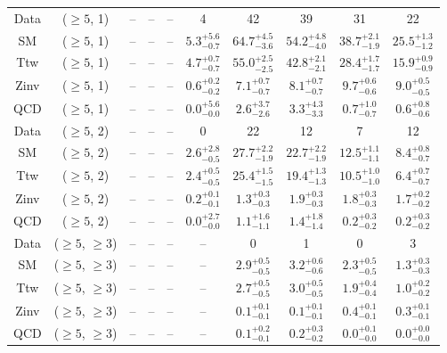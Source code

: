 \begin{table}[h!]
{\begin{tabular}{cccccccccc}
	Data & ($\ge5$, 1) & -- & -- & -- & 4 & 42 & 39 & 31 & 22 \\[0.5ex] 
	SM & ($\ge5$, 1) & -- & -- & -- & $5.3^{+ 5.6 }_{- 0.7 }$ & $64.7^{+ 4.5 }_{- 3.6 }$ & $54.2^{+ 4.8 }_{- 4.0 }$ & $38.7^{+ 2.1 }_{- 1.9 }$ & $25.5^{+ 1.3 }_{- 1.2 }$ \\[0.5ex] 
	Ttw & ($\ge5$, 1) & -- & -- & -- & $4.7^{+ 0.7 }_{- 0.7 }$ & $55.0^{+ 2.5 }_{- 2.5 }$ & $42.8^{+ 2.1 }_{- 2.1 }$ & $28.4^{+ 1.7 }_{- 1.7 }$ & $15.9^{+ 0.9 }_{- 0.9 }$ \\[0.5ex] 
	Zinv & ($\ge5$, 1) & -- & -- & -- & $0.6^{+ 0.2 }_{- 0.2 }$ & $7.1^{+ 0.7 }_{- 0.7 }$ & $8.1^{+ 0.7 }_{- 0.7 }$ & $9.7^{+ 0.6 }_{- 0.6 }$ & $9.0^{+ 0.5 }_{- 0.5 }$ \\[0.5ex] 
	QCD & ($\ge5$, 1) & -- & -- & -- & $0.0^{+ 5.6 }_{- 0.0 }$ & $2.6^{+ 3.7 }_{- 2.6 }$ & $3.3^{+ 4.3 }_{- 3.3 }$ & $0.7^{+ 1.0 }_{- 0.7 }$ & $0.6^{+ 0.8 }_{- 0.6 }$ \\[0.5ex] 
	Data & ($\ge5$, 2) & -- & -- & -- & 0 & 22 & 12 & 7 & 12 \\[0.5ex] 
	SM & ($\ge5$, 2) & -- & -- & -- & $2.6^{+ 2.8 }_{- 0.5 }$ & $27.7^{+ 2.2 }_{- 1.9 }$ & $22.7^{+ 2.2 }_{- 1.9 }$ & $12.5^{+ 1.1 }_{- 1.1 }$ & $8.4^{+ 0.8 }_{- 0.7 }$ \\[0.5ex] 
	Ttw & ($\ge5$, 2) & -- & -- & -- & $2.4^{+ 0.5 }_{- 0.5 }$ & $25.4^{+ 1.5 }_{- 1.5 }$ & $19.4^{+ 1.3 }_{- 1.3 }$ & $10.5^{+ 1.0 }_{- 1.0 }$ & $6.4^{+ 0.7 }_{- 0.7 }$ \\[0.5ex] 
	Zinv & ($\ge5$, 2) & -- & -- & -- & $0.2^{+ 0.1 }_{- 0.1 }$ & $1.3^{+ 0.3 }_{- 0.3 }$ & $1.9^{+ 0.3 }_{- 0.3 }$ & $1.8^{+ 0.3 }_{- 0.3 }$ & $1.7^{+ 0.2 }_{- 0.2 }$ \\[0.5ex] 
	QCD & ($\ge5$, 2) & -- & -- & -- & $0.0^{+ 2.7 }_{- 0.0 }$ & $1.1^{+ 1.6 }_{- 1.1 }$ & $1.4^{+ 1.8 }_{- 1.4 }$ & $0.2^{+ 0.3 }_{- 0.2 }$ & $0.2^{+ 0.3 }_{- 0.2 }$ \\[0.5ex] 
	Data & ($\ge5$, $\ge3$) & -- & -- & -- & -- & 0 & 1 & 0 & 3 \\[0.5ex] 
	SM & ($\ge5$, $\ge3$) & -- & -- & -- & -- & $2.9^{+ 0.5 }_{- 0.5 }$ & $3.2^{+ 0.6 }_{- 0.6 }$ & $2.3^{+ 0.5 }_{- 0.5 }$ & $1.3^{+ 0.3 }_{- 0.3 }$ \\[0.5ex] 
	Ttw & ($\ge5$, $\ge3$) & -- & -- & -- & -- & $2.7^{+ 0.5 }_{- 0.5 }$ & $3.0^{+ 0.5 }_{- 0.5 }$ & $1.9^{+ 0.4 }_{- 0.4 }$ & $1.0^{+ 0.2 }_{- 0.2 }$ \\[0.5ex] 
	Zinv & ($\ge5$, $\ge3$) & -- & -- & -- & -- & $0.1^{+ 0.1 }_{- 0.1 }$ & $0.1^{+ 0.1 }_{- 0.1 }$ & $0.4^{+ 0.1 }_{- 0.1 }$ & $0.3^{+ 0.1 }_{- 0.1 }$ \\[0.5ex] 
	QCD & ($\ge5$, $\ge3$) & -- & -- & -- & -- & $0.1^{+ 0.2 }_{- 0.1 }$ & $0.2^{+ 0.3 }_{- 0.2 }$ & $0.0^{+ 0.1 }_{- 0.0 }$ & $0.0^{+ 0.0 }_{- 0.0 }$ \\[0.5ex] 
	\hline
	\hline
\end{tabular}}
\end{table}
